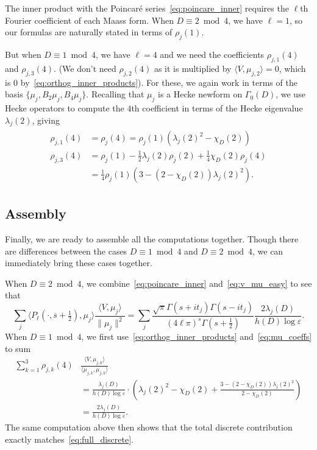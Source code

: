 \documentclass[11pt,reqno,oneside]{amsart}
\theoremstyle{plain}
\theoremstyle{definition}
\begin{document}
The inner product with the Poincar\'e series~\eqref{eq:poincare_inner}
requires the $\ell$th Fourier coefficient of each Maass form.
When $D \equiv 2 \bmod 4$, we have $\ell = 1$, so our formulas are naturally stated in terms of $\rho_j(1)$.

But when $D \equiv 1 \bmod 4$, we have $\ell = 4$ and we need the coefficients
$\rho_{j, 1}(4)$ and $\rho_{j, 3}(4)$.
(We don't need $\rho_{j, 2}(4)$ as it is multiplied by $\langle V, \mu_{j, 2}
  \rangle = 0$, which is $0$ by~\eqref{eq:orthog_inner_products}).
For these, we again work in terms of the basis $\{ \mu_j, B_2 \mu_j, B_4 \mu_j
  \}$.
Recalling that $\mu_j$ is a Hecke newform on $\Gamma_0(D)$, we use Hecke
operators to compute the $4$th coefficient in terms of the Hecke eigenvalue
$\lambda_j(2)$, giving
\begin{align}
  \begin{split}\label{eq:mu_coeffs}
    \rho_{j,1}(4) & = \rho_j(4) = \rho_j(1)(\lambda_j(2)^2 - \chi_D(2))
    \\
    \rho_{j,3}(4) & = \rho_j(1) - \tfrac{1}{2} \lambda_j(2) \rho_j(2) + \tfrac{1}{4} \chi_D(2) \rho_j(4) \\
                  & = \tfrac{1}{4} \rho_j(1) (3 - (2-\chi_D(2)) \lambda_j(2)^2).
  \end{split}
\end{align}


\subsection{Assembly}

Finally, we are ready to assemble all the computations together.
Though there are differences between the cases $D \equiv 1 \bmod 4$ and $D
  \equiv 2 \bmod 4$, we can immediately bring these cases together.

When $D \equiv 2 \bmod 4$, we combine~\eqref{eq:poincare_inner}
and~\eqref{eq:v_mu_easy} to see that
\begin{equation}\label{eq:full_discrete}
  \sum_j \langle P_\ell(\cdot, \overline{s}+\tfrac{1}{2}), \mu_j \rangle
  \frac{\langle V, \mu_j \rangle}{\lVert \mu_j \rVert^2}
  =
  \sum_j
  \frac{\sqrt{\pi} \Gamma(s + it_j) \Gamma(s - it_j)}
  {(4 \ell \pi)^{s} \Gamma(s+\frac{1}{2})}
  \frac{2 \lambda_j(D)}{h(D) \log \varepsilon}.
\end{equation}
When $D \equiv 1 \bmod 4$, we first use~\eqref{eq:orthog_inner_products}
and~\eqref{eq:mu_coeffs} to sum
\begin{align*}
  \sum_{k=1}^{3} \rho_{j,k}(4) & \frac{\langle V, \mu_{j,k} \rangle}{\langle \mu_{j,k}, \mu_{j,k} \rangle}
  \\
                               & = \frac{\lambda_j(D)}{h(D) \log \varepsilon} \cdot \left( \lambda_j(2)^2 - \chi_D(2) + \tfrac{3 - (2-\chi_D(2)) \lambda_j(2)^2}{2-\chi_D(2)} \right) \\
                               & = \frac{2 \lambda_j(D)}{h(D) \log \varepsilon}.
\end{align*}
The same computation above then shows that the total discrete contribution
exactly matches~\eqref{eq:full_discrete}.
\end{document}
